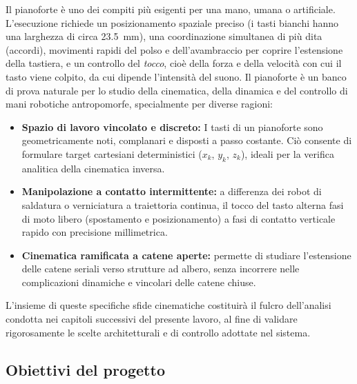Il pianoforte è uno dei compiti più esigenti per una mano, umana o artificiale. 
L'esecuzione richiede un posizionamento spaziale preciso (i tasti bianchi hanno una larghezza di circa 23.5~mm), una coordinazione simultanea di più dita (accordi), movimenti rapidi del polso e dell'avambraccio per coprire l'estensione della tastiera, e un controllo del \emph{tocco}, cioè della forza e della velocità con cui il tasto viene colpito, da cui dipende l'intensità del suono. 
Il pianoforte è un banco di prova naturale per lo studio della cinematica, della dinamica e del controllo di mani robotiche antropomorfe, specialmente per diverse ragioni:
\begin{itemize}
    \item \textbf{Spazio di lavoro vincolato e discreto:} I tasti di un pianoforte sono geometricamente noti, complanari e disposti a passo costante. Ciò consente di formulare target cartesiani deterministici ($x_k$, $y_k$, $z_k$), ideali per la verifica analitica della cinematica inversa.
    \item \textbf{Manipolazione a contatto intermittente:} a differenza dei robot di saldatura o verniciatura a traiettoria continua, il tocco del tasto alterna fasi di moto libero (spostamento e posizionamento) a fasi di contatto verticale rapido con precisione millimetrica.
    \item \textbf{Cinematica ramificata a catene aperte:} permette di studiare l'estensione delle catene seriali verso strutture ad albero, senza incorrere nelle complicazioni dinamiche e vincolari delle catene chiuse.
\end{itemize}
L'insieme di queste specifiche sfide cinematiche costituirà il fulcro dell'analisi condotta nei capitoli successivi del presente lavoro, al fine di validare rigorosamente le scelte architetturali e di controllo adottate nel sistema.

\subsection{Obiettivi del progetto}

